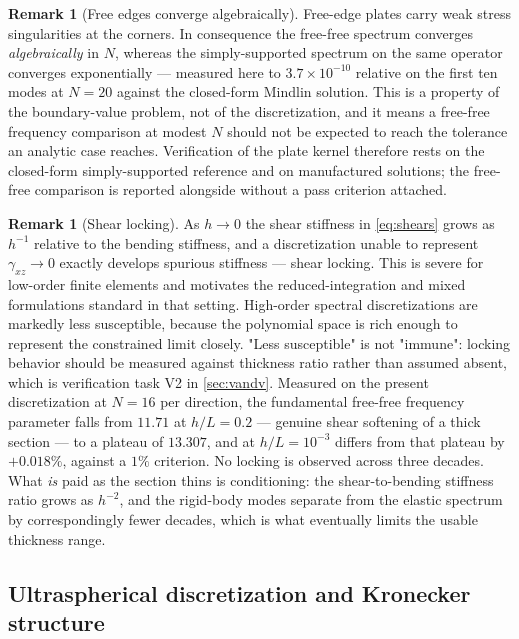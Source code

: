\documentclass[11pt,a4paper]{article}
\theoremstyle{definition}
\newtheorem{remark}[theorem]{Remark}
\numberwithin{equation}{section}
\begin{document}
\begin{remark}[Free edges converge algebraically]
\label{rem:cornersing}
Free-edge plates carry weak stress singularities at the corners. In consequence the free-free spectrum converges \emph{algebraically} in $N$, whereas the simply-supported spectrum on the same operator converges exponentially --- measured here to $3.7\times10^{-10}$ relative on the first ten modes at $N=20$ against the closed-form Mindlin solution. This is a property of the boundary-value problem, not of the discretization, and it means a free-free frequency comparison at modest $N$ should not be expected to reach the tolerance an analytic case reaches. Verification of the plate kernel therefore rests on the closed-form simply-supported reference and on manufactured solutions; the free-free comparison is reported alongside without a pass criterion attached.
\end{remark}

\begin{remark}[Shear locking]
\label{rem:locking}
As $h \to 0$ the shear stiffness in \cref{eq:shears} grows as $h^{-1}$ relative to the bending stiffness, and a discretization unable to represent $\gamma_{xz} \to 0$ exactly develops spurious stiffness --- shear locking. This is severe for low-order finite elements and motivates the reduced-integration and mixed formulations standard in that setting. High-order spectral discretizations are markedly less susceptible, because the polynomial space is rich enough to represent the constrained limit closely. "Less susceptible" is not "immune": locking behavior should be measured against thickness ratio rather than assumed absent, which is verification task V2 in \cref{sec:vandv}. Measured on the present discretization at $N=16$ per direction, the fundamental free-free frequency parameter falls from $11.71$ at $h/L = 0.2$ --- genuine shear softening of a thick section --- to a plateau of $13.307$, and at $h/L = 10^{-3}$ differs from that plateau by $+0.018\%$, against a $1\%$ criterion. No locking is observed across three decades. What \emph{is} paid as the section thins is conditioning: the shear-to-bending stiffness ratio grows as $h^{-2}$, and the rigid-body modes separate from the elastic spectrum by correspondingly fewer decades, which is what eventually limits the usable thickness range.
\end{remark}

\subsection{Ultraspherical discretization and Kronecker structure}
\label{sec:ultraspherical}
\end{document}
